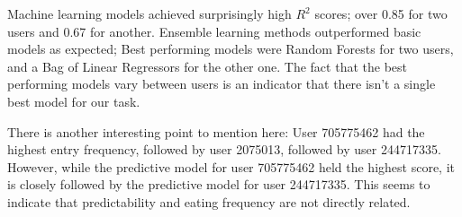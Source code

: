 Machine learning models achieved surprisingly high $R^2$ scores; over 0.85 for two users and 0.67 for another.
Ensemble learning methods outperformed basic models as expected;
Best performing models were Random Forests for two users, and a Bag of Linear Regressors for the other one.
The fact that the best performing models vary between users is an indicator that there isn't a single best model for our task. 

There is another interesting point to mention here:
User 705775462 had the highest entry frequency, followed by user 2075013, followed by user 244717335.
However, while the predictive model for user  705775462 held the highest score, 
it is closely followed by the predictive model for user 244717335.
This seems to indicate that predictability and eating frequency are not directly related.


